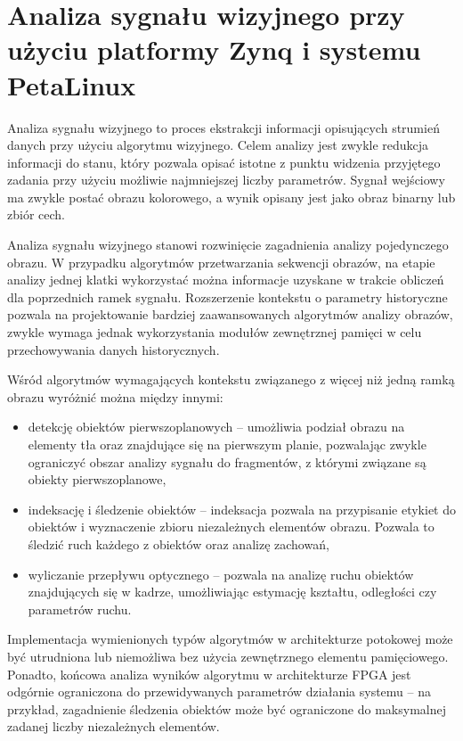 \chapter{Analiza sygnału wizyjnego przy użyciu platformy Zynq i systemu PetaLinux}
\label{cha:project}



Analiza sygnału wizyjnego to proces ekstrakcji informacji opisujących strumień danych przy użyciu algorytmu wizyjnego. Celem analizy jest zwykle redukcja informacji do stanu, który pozwala opisać istotne z punktu widzenia przyjętego zadania przy użyciu możliwie najmniejszej liczby parametrów. Sygnał wejściowy ma zwykle postać obrazu kolorowego, a wynik opisany jest jako obraz binarny lub zbiór cech.

Analiza sygnału wizyjnego stanowi rozwinięcie zagadnienia analizy pojedynczego obrazu. W przypadku algorytmów przetwarzania sekwencji obrazów, na etapie analizy jednej klatki wykorzystać można informacje uzyskane w trakcie obliczeń dla poprzednich ramek sygnału. Rozszerzenie kontekstu o parametry historyczne pozwala na projektowanie bardziej zaawansowanych algorytmów analizy obrazów, zwykle wymaga jednak wykorzystania modułów zewnętrznej pamięci w celu przechowywania danych historycznych.

Wśród algorytmów wymagających kontekstu związanego z więcej niż jedną ramką obrazu wyróżnić można między innymi:
\begin{itemize}
	\item detekcję obiektów pierwszoplanowych -- umożliwia podział obrazu na elementy tła oraz znajdujące się na pierwszym planie, pozwalając zwykle ograniczyć obszar analizy sygnału do fragmentów, z którymi związane są obiekty pierwszoplanowe,

	\item indeksację i śledzenie obiektów -- indeksacja pozwala na przypisanie etykiet do obiektów i wyznaczenie zbioru niezależnych elementów obrazu. Pozwala to śledzić ruch każdego z obiektów oraz analizę zachowań,
	
	\item wyliczanie przepływu optycznego -- pozwala na analizę ruchu obiektów znajdujących się w kadrze, umożliwiając estymację kształtu, odległości czy parametrów ruchu.
\end{itemize}

Implementacja wymienionych typów algorytmów w architekturze potokowej może być utrudniona lub niemożliwa bez użycia zewnętrznego elementu pamięciowego. Ponadto, końcowa analiza wyników algorytmu w architekturze FPGA jest odgórnie ograniczona do przewidywanych parametrów działania systemu -- na przykład, zagadnienie śledzenia obiektów może być ograniczone do maksymalnej zadanej liczby niezależnych elementów.

